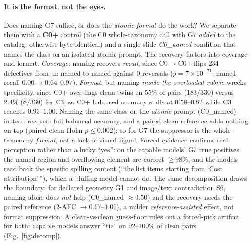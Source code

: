 \documentclass[10pt]{article}
\newcommand{\g}[1]{\textsf{#1}}        %
\begin{document}
\paragraph{It is the format, not the eyes.}
Does naming \g{G7} suffice, or does the \emph{atomic format} do the work? We separate them with a \textbf{C0+}
control (the C0 whole-taxonomy call with \g{G7} \emph{added} to the catalog, otherwise byte-identical) and a
single-slide \emph{C0\_named} condition that names the class on an isolated atomic prompt. The recovery factors
into coverage and format. \emph{Coverage}: naming recovers \emph{recall}, since C0$\to$C0+ flips 234
defectives from un-named to named against 0 reversals ($p{=}7\!\times\!10^{-71}$; named-recall
$0.00\!\to\!0.64$--$0.97$). \emph{Format}: but naming \emph{inside the overloaded rubric} wrecks
specificity, since C0+ over-flags clean twins on 55\% of pairs ($183/330$) versus 2.4\% ($8/330$)
for C3, so C0+ balanced accuracy stalls at $0.58$--$0.82$ while C3 reaches $0.93$--$1.00$. Naming the same class
on the \emph{atomic} prompt (C0\_named) instead recovers full balanced accuracy, and a paired clean reference
adds nothing on top (paired-clean Holm $p\le0.002$): so for \g{G7} the suppressor is the whole-taxonomy
\emph{format}, not a lack of visual signal. Forced evidence confirms real perception rather
than a lucky ``yes'': on the capable models' \g{G7} true positives the named region and overflowing element are
correct $\ge$98\%, and the models read back the specific spilling content (``the list items starting from `Cost
attribution'\,''), which a bluffing model cannot do. The same decomposition draws the boundary: for declared
geometry \g{G1} and image/text contradiction \g{S6}, naming alone does \emph{not} help (C0\_named
$\approx0.50$) and the recovery needs the paired reference (2-AFC $\to0.97$--$1.00$), a milder
\emph{reference-assisted} effect, not format suppression. A clean-vs-clean guess-floor rules out a
forced-pick artifact for both: capable models answer ``tie'' on $92$--$100\%$ of clean pairs
(Fig.~\ref{fig:decomp}).
\end{document}

